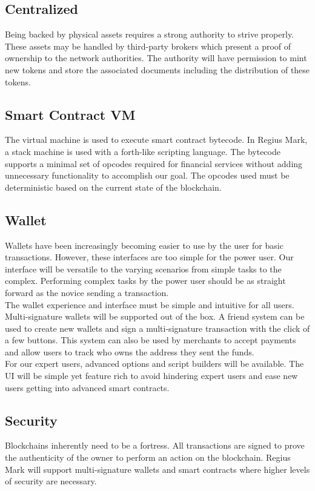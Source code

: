 \documentclass[12pt,a4paper]{article}
\begin{document}
  \subsection{Centralized}
  Being backed by physical assets requires a strong authority to strive
  properly. These assets may be handled by third-party brokers which present a
  proof of ownership to the network authorities. The authority will have
  permission to mint new tokens and store the associated documents including
  the distribution of these tokens.

  \subsection{Smart Contract VM}
  The virtual machine is used to execute smart contract bytecode. In Regius
  Mark, a stack machine is used with a forth-like scripting language. The
  bytecode supports a minimal set of opcodes required for financial services
  without adding unnecessary functionality to accomplish our goal. The opcodes
  used must be deterministic based on the current state of the blockchain.

  \subsection{Wallet}
  Wallets have been increasingly becoming easier to use by the user for
  basic transactions. However, these interfaces are too simple for the power
  user. Our interface will be versatile to the varying scenarios from simple
  tasks to the complex. Performing complex tasks by the power user should be as
  straight forward as the novice sending a transaction.\\

  The wallet experience and interface must be simple and intuitive for all
  users. Multi-signature wallets will be supported out of the box. A friend
  system can be used to create new wallets and sign a multi-signature
  transaction with the click of a few buttons. This system can also be used by
  merchants to accept payments and allow users to track who owns the address
  they sent the funds.\\

  For our expert users, advanced options and script builders will be available.
  The UI will be simple yet feature rich to avoid hindering expert users and
  ease new users getting into advanced smart contracts.

  \subsection{Security}
  Blockchains inherently need to be a fortress. All transactions are signed to
  prove the authenticity of the owner to perform an action on the blockchain.
  Regius Mark will support multi-signature wallets and smart contracts where
  higher levels of security are necessary.\\
\end{document}
